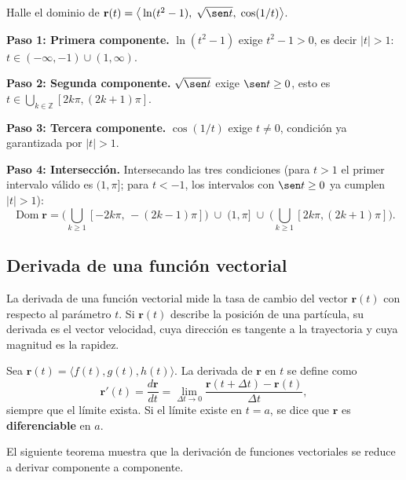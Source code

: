 \begin{prob}
Halle el dominio de $\mathbf{r}(t)=\big\langle \ln(t^2-1),\;
\sqrt{\sen t},\; \cos(1/t)\big\rangle$.
\begin{myproof}
\textbf{Paso 1: Primera componente.}
$\ln(t^2-1)$ exige $t^2-1>0$, es decir $|t|>1$:
$t\in(-\infty,-1)\cup(1,\infty)$.

\textbf{Paso 2: Segunda componente.}
$\sqrt{\sen t}$ exige $\sen t\ge 0$, esto es
$t\in\bigcup_{k\in\mathbb{Z}}[2k\pi,(2k+1)\pi]$.

\textbf{Paso 3: Tercera componente.}
$\cos(1/t)$ exige $t\neq 0$, condición ya garantizada por $|t|>1$.

\textbf{Paso 4: Intersección.}
Intersecando las tres condiciones (para $t>1$ el primer intervalo válido es
$(1,\pi]$; para $t<-1$, los intervalos con $\sen t\ge0$ ya cumplen $|t|>1$):
\[
  \boxed{\ \operatorname{Dom}\mathbf{r}
  =\Big(\bigcup_{k\ge 1}[-2k\pi,\,-(2k-1)\pi]\Big)
   \;\cup\;(1,\pi]\;\cup\;
   \Big(\bigcup_{k\ge 1}[2k\pi,(2k+1)\pi]\Big).\ }
\]
\end{myproof}
\end{prob}

\subsection{Derivada de una función vectorial}

La derivada de una función vectorial mide la tasa de cambio del vector
$\mathbf{r}(t)$ con respecto al parámetro $t$. Si $\mathbf{r}(t)$
describe la posición de una partícula, su derivada es el vector
velocidad, cuya dirección es tangente a la trayectoria y cuya magnitud
es la rapidez.

\begin{definition}
Sea $\mathbf{r}(t) = \langle f(t), g(t), h(t) \rangle$. La derivada de
$\mathbf{r}$ en $t$ se define como
\[
\mathbf{r}'(t) = \frac{d\mathbf{r}}{dt}
= \lim_{\Delta t \to 0} \frac{\mathbf{r}(t+\Delta t) - \mathbf{r}(t)}
                             {\Delta t},
\]
siempre que el límite exista. Si el límite existe en $t=a$, se dice que
$\mathbf{r}$ es \textbf{diferenciable} en $a$.
\end{definition}

El siguiente teorema muestra que la derivación de funciones vectoriales
se reduce a derivar componente a componente.

